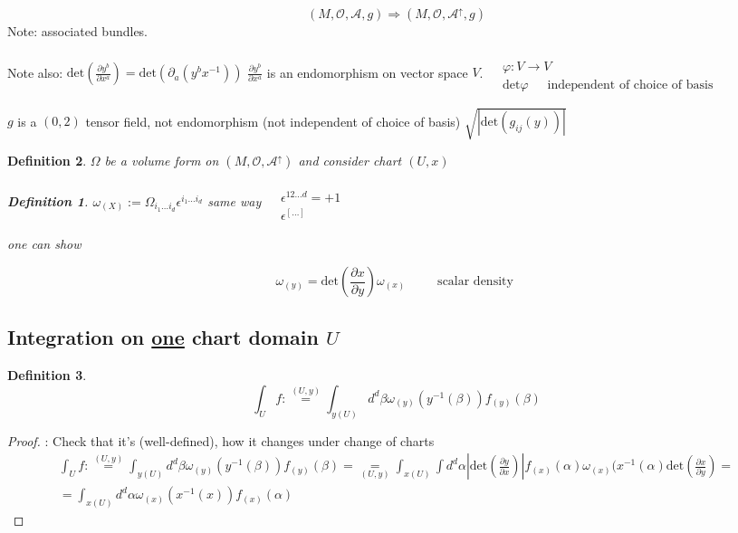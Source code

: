 \documentclass[10pt, twoside]{amsart}
\newtheorem{definition}{Definition}
\begin{document}
\begin{multicols*}{2}
\[
(M, \mathcal{O}, \mathcal{A},g) \Longrightarrow (M,\mathcal{O},\mathcal{A}^{\uparrow} ,g)
\]
Note: associated bundles.

Note also:
$ \text{det}\left( \frac{ \partial y^b}{ \partial x^a} \right) = \text{det}(\partial_a(y^bx^{-1}))$ \phantom{ \quad \quad \, } $\frac{ \partial y^b}{ \partial x^a}$ is an endomorphism on vector space $V$.  $\begin{aligned} & \quad \\ 
& \varphi : V \to V \\
& \text{det}\varphi \quad \, \text{ independent of choice of basis } \end{aligned}$

\phantom{\quad \quad \, } $g$ is a $(0,2)$ tensor field, not endomorphism (not independent of choice of basis) $\sqrt{ |\text{det}(g_{ij}(y)) | }$

\begin{definition} $\Omega$ be a volume form on $(M,\mathcal{O}, \mathcal{A}^{\uparrow} )$ and consider chart $(U,x)$ 
\begin{definition} $\omega_{(X)} := \Omega_{i_1\dots i_d} \epsilon^{i_1\dots i_d}$
same way $\begin{aligned} & \quad \\ 
& \epsilon^{12 \dots d} = +1 \\ 
& \epsilon^{[\dots ]} \end{aligned}$

one can show

\[
\boxed{ \omega_{(y)} = \text{det}\left( \frac{ \partial x}{ \partial y} \right) \omega_{(x)} } \quad \quad \, \text{ scalar density }
\]
\end{definition}
\end{definition}

\subsection{Integration on \underline{one} chart domain $U$}

\begin{definition}
\begin{equation}
\boxed{ \int_U f :\overset{ (U,y) }{=} \int_{y(U)} d^d\beta \omega_{(y)}(y^{-1}(\beta)) f_{(y)}(\beta) }
\end{equation}
\end{definition}

\begin{proof}: Check that it's (well-defined), how it changes under change of charts
\[
\begin{gathered}
\int_U f :\overset{ (U,y) }{=} \int_{y(U)} d^d\beta \omega_{(y)}(y^{-1}(\beta)) f_{(y)}(\beta) = \underset{ (U,y)}{=} \int_{x(U)} \int d^d\alpha \left| \text{det}\left( \frac{ \partial y }{ \partial x}\right) \right| f_{(x)}(\alpha) \omega_{(x)}(x^{-1}(\alpha) \text{det}\left( \frac{ \partial x}{ \partial y } \right) = \\
= \int_{x(U)} d^d \alpha \omega_{(x)}(x^{-1}(x)) f_{(x)}(\alpha)
\end{gathered}
\]
\end{proof}


\end{multicols*}
\end{document}
